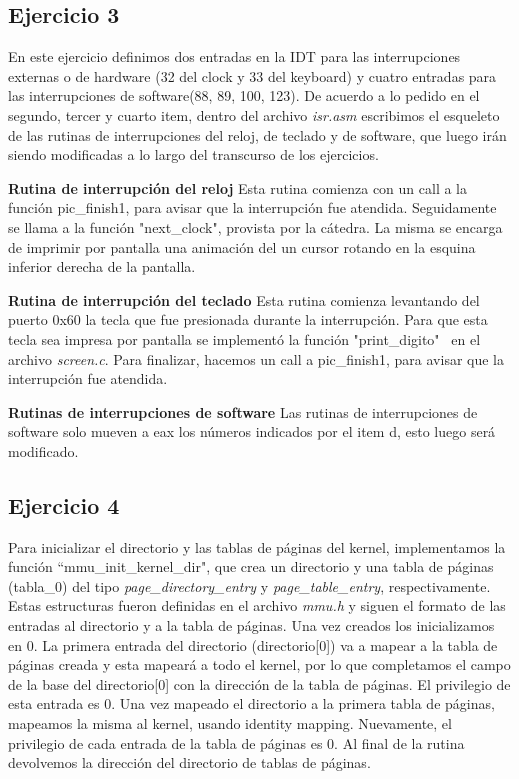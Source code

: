 \documentclass[a4paper]{article}
\begin{document}


\subsection{Ejercicio 3}
\justify
En este ejercicio definimos dos entradas en la IDT para las interrupciones externas o de hardware (32 del clock y 33 del keyboard) y cuatro entradas para las interrupciones de software(88, 89, 100, 123).
\justify
De acuerdo a lo pedido en el segundo, tercer y cuarto item, dentro del archivo \textit{isr.asm} escribimos el esqueleto de las rutinas de interrupciones del reloj, de teclado y de software, que luego irán siendo modificadas a lo largo del transcurso de los ejercicios.

\justify
\textbf{Rutina de interrupción del reloj}
\justify
Esta rutina comienza con un call a la función pic_finish1, para avisar que la interrupción fue atendida. Seguidamente se llama a la función "next_clock", provista por la cátedra. La misma se encarga de imprimir por pantalla una animación del un cursor rotando en la esquina inferior derecha de la pantalla.

\justify
\textbf{Rutina de interrupción del teclado}
\justify
Esta rutina comienza levantando del puerto 0x60 la tecla que fue presionada durante la interrupción. Para que esta tecla sea impresa por pantalla se implementó la función "print_digito" \ en el archivo \textit{screen.c}. Para finalizar, hacemos un call a pic_finish1, para avisar que la interrupción fue atendida.

\justify
\textbf{Rutinas de interrupciones de software}
\justify
Las rutinas de interrupciones de software solo mueven a eax los números indicados por el item d, esto luego será modificado.

\subsection{Ejercicio 4}
\justify
Para inicializar el directorio y las tablas de páginas del kernel, implementamos la función ``mmu_init_kernel_dir", que crea un directorio y una tabla de páginas (tabla_0) del tipo \textit{page_directory_entry}  y \textit{page_table_entry}, respectivamente. Estas estructuras fueron definidas en el archivo \textit{mmu.h} y siguen el formato de las entradas al directorio y a la tabla de páginas. Una vez creados los inicializamos en 0.
\justify
La primera entrada del directorio (directorio[0]) va a mapear a la tabla de páginas creada y esta mapeará a todo el kernel, por lo que completamos el campo de la base del directorio[0] con la dirección de la tabla de páginas. El privilegio de esta entrada es 0. Una vez mapeado el directorio a la primera tabla de páginas, mapeamos la misma al kernel, usando identity mapping. Nuevamente, el privilegio de cada entrada de la tabla de páginas es 0. Al final de la rutina devolvemos la dirección del directorio de tablas de páginas. 
 
\end{document}
